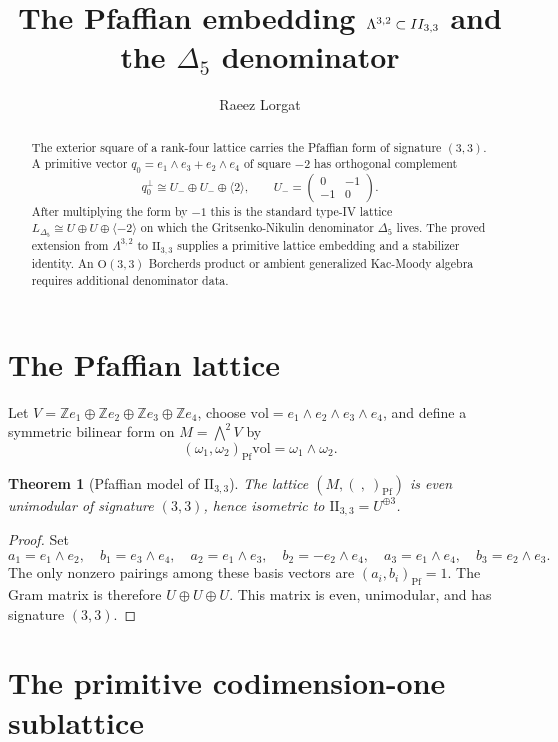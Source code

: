 \documentclass[11pt]{article}
\title{\texorpdfstring{The Pfaffian embedding
$\Lat^{3,2}\subset \II_{3,3}$ and the
$\Delta_5$ denominator}{The Pfaffian embedding Lambda(3,2) in II(3,3)
and the Delta5 denominator}}
\author{Raeez Lorgat}
\date{}
\providecommand{\Lat}{\Lambda}
\providecommand{\Z}{\mathbb{Z}}
\providecommand{\OO}{\mathrm{O}}
\providecommand{\II}{\mathrm{II}}
\theoremstyle{plain}
\newtheorem{theorem}{Theorem}
\theoremstyle{definition}
\begin{document}
\maketitle

\begin{abstract}
The exterior square of a rank-four lattice carries the Pfaffian form
of signature $(3,3)$.  A primitive vector
$q_0=e_1\wedge e_3+e_2\wedge e_4$ of square $-2$ has orthogonal
complement
\[
q_0^\perp \cong U_-\oplus U_-\oplus\langle 2\rangle,
\qquad
U_-=\begin{pmatrix}0&-1\\-1&0\end{pmatrix}.
\]
After multiplying the form by $-1$ this is the standard type-IV
lattice $L_{\Delta_5}\cong U\oplus U\oplus\langle -2\rangle$ on which
the Gritsenko-Nikulin denominator $\Delta_5$ lives.  The proved
extension from $\Lat^{3,2}$ to $\II_{3,3}$ supplies a primitive lattice
embedding and a stabilizer identity.  An $\OO(3,3)$ Borcherds product
or ambient generalized Kac-Moody algebra requires additional
denominator data.
\end{abstract}

\section{The Pfaffian lattice}

Let $V=\Z e_1\oplus\Z e_2\oplus\Z e_3\oplus\Z e_4$, choose
$\mathrm{vol}=e_1\wedge e_2\wedge e_3\wedge e_4$, and define a
symmetric bilinear form on $M=\bigwedge^2 V$ by
\[
(\omega_1,\omega_2)_{\mathrm{Pf}}\mathrm{vol}
=\omega_1\wedge\omega_2 .
\]

\begin{theorem}[Pfaffian model of $\II_{3,3}$]
\label{thm:pfaffian-II33}
The lattice $(M,(\ ,\ )_{\mathrm{Pf}})$ is even unimodular of
signature $(3,3)$, hence isometric to $\II_{3,3}=U^{\oplus 3}$.
\end{theorem}

\begin{proof}
Set
\[
a_1=e_1\wedge e_2,\quad b_1=e_3\wedge e_4,\quad
a_2=e_1\wedge e_3,\quad b_2=-e_2\wedge e_4,\quad
a_3=e_1\wedge e_4,\quad b_3=e_2\wedge e_3 .
\]
The only nonzero pairings among these basis vectors are
$(a_i,b_i)_{\mathrm{Pf}}=1$.  The Gram matrix is therefore
$U\oplus U\oplus U$.  This matrix is even, unimodular, and has
signature $(3,3)$.
\end{proof}

\section{The primitive codimension-one sublattice}
\end{document}
